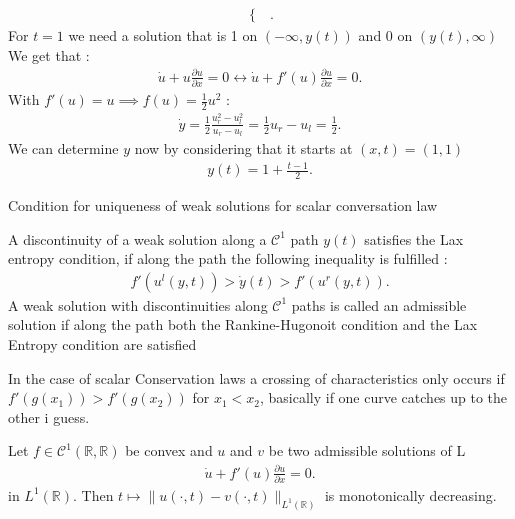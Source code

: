 \begin{example}
\begin{align*}
\begin{cases}
  \end{cases}
 .\end{align*}
 For $t=1$ we need a solution that is 1 on $(-\infty,y(t))$ and 0 on $(y(t),\infty)$ \\[1ex]
 We get that : 
 \begin{align*}
   \dot{u} + u \frac{\partial u}{\partial x}  = 0 \leftrightarrow  \dot{u} + f'(u) \frac{\partial u}{\partial x}  = 0
 .\end{align*}
With $f'(u) = u \implies f(u) = \frac{1}{2} u^2$ : 
\begin{align*}
  \dot{y} = \frac{1}{2} \frac{u_{r}^2- u_l^2 }{u_r-u_l} = \frac{1}{2} u_r-u_l =  \frac{1}{2}
.\end{align*}
We can determine $y$ now by considering that it starts at $(x,t) = (1,1)$
\begin{align*}
  y(t) = 1 + \frac{t-1}{2}
.\end{align*}
\end{example}
Condition for uniqueness of weak solutions for scalar conversation law
\begin{definition}
  A discontinuity of a weak solution along a $\mathcal{C}^1$ path $y(t)$ satisfies the Lax entropy condition, if 
  along the path the following inequality is fulfilled : 
  \begin{align*}
    f'(u^{l}(y,t) )> \dot{y}(t) > f'(u^{r}(y,t) )
  .\end{align*}
  A weak solution with discontinuities along $\mathcal{C}^{1} $ paths is called an admissible solution if along the path 
  both the Rankine-Hugonoit condition and the Lax Entropy condition are satisfied
\end{definition}
In the case of scalar Conservation laws a crossing of characteristics only occurs if $f'(g(x_1))>f'(g(x_2))$ for $x_1<x_2$,
basically if one curve catches up to the other i guess.
\begin{theorem}
  Let $f \in  \mathcal{C}^1(\mathbb{R},\mathbb{R})$ be convex and $u$ and $v$ be two admissible solutions of L
  \begin{align*}
    \dot{u}  + f'(u) \frac{\partial u}{\partial x} = 0
  .\end{align*}
  in $L^1(\mathbb{R})$. Then $t \mapsto \|u(\cdot,t) - v(\cdot,t)\|_{L^1(\mathbb{R})}$ is monotonically decreasing.
\end{theorem}
